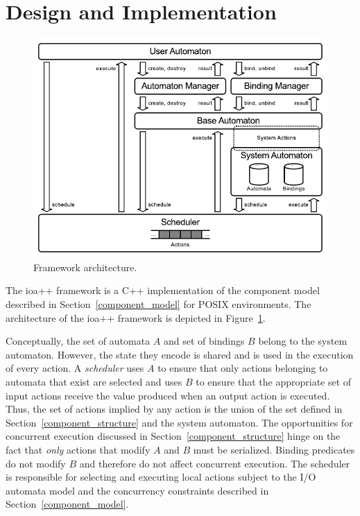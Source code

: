 \section{Design and Implementation\label{design}}

\begin{figure}
\center
\includegraphics[width=\columnwidth]{architecture}
\caption{Framework architecture.}
\label{framework_architecture}
\end{figure}

The ioa++ framework is a C++ implementation of the component model described in Section~\ref{component_model} for POSIX environments.
The architecture of the ioa++ framework is depicted in Figure~\ref{framework_architecture}.

Conceptually, the set of automata $A$ and set of bindings $B$ belong to the system automaton.
However, the state they encode is shared and is used in the execution of every action.
A \emph{scheduler} uses $A$ to ensure that only actions belonging to automata that exist are selected and uses $B$ to ensure that the appropriate set of input actions receive the value produced when an output action is executed.
Thus, the set of actions implied by any action is the union of the set defined in Section~\ref{component_structure} and the system automaton.
The opportunities for concurrent execution discussed in Section~\ref{component_structure} hinge on the fact that \emph{only} actions that modify $A$ and $B$ must be serialized.
Binding predicates do not modify $B$ and therefore do not affect concurrent execution.
The scheduler is responsible for selecting and executing local actions subject to the I/O automata model and the concurrency constraints described in Section~\ref{component_model}.

